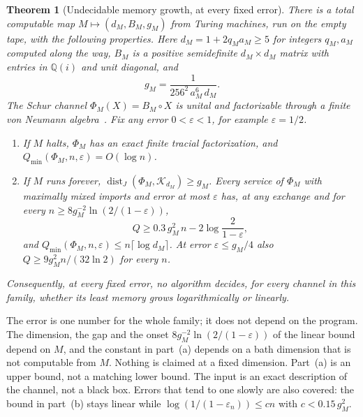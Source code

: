 \documentclass[11pt]{article}
\newtheorem{theorem}{Theorem}
\theoremstyle{definition}
\theoremstyle{remark}
\DeclareMathOperator{\dist}{dist}
\newcommand{\K}{\mathcal K}
\newcommand{\eps}{\varepsilon}
\begin{document}
\begin{theorem}[Undecidable memory growth, at every fixed error]\label{thm:undecidable}
There is a total computable map $M\mapsto(d_M,B_M,g_M)$ from Turing machines, run on the empty tape, with the following properties. Here $d_M=1+2q_Ma_M\ge5$ for integers $q_M,a_M$ computed along the way, $B_M$ is a positive semidefinite $d_M\times d_M$ matrix with entries in $\mathbb Q(i)$ and unit diagonal, and
\[
 g_M=\frac{1}{256^2\,a_M^6\,d_M}.
\]
The Schur channel $\Phi_M(X)=B_M\circ X$ is unital and factorizable through a finite von Neumann algebra~\cite[Proposition~2.8]{HM2011}. Fix any error $0<\eps<1$, for example $\eps=1/2$.
\begin{enumerate}[label=(\alph*),itemsep=3pt]
\item If $M$ halts, $\Phi_M$ has an exact finite tracial factorization, and $Q_{\min}(\Phi_M,n,\eps)=O(\log n)$.
\item If $M$ runs forever, $\dist_J(\Phi_M,\K_{d_M})\ge g_M$. Every service of $\Phi_M$ with maximally mixed imports and error at most $\eps$ has, at any exchange and for every $n\ge8g_M^{-2}\ln(2/(1-\eps))$,
\[
 Q\ge0.3\,g_M^2\,n-2\log\frac2{1-\eps},
\]
and $Q_{\min}(\Phi_M,n,\eps)\le n\lceil\log d_M\rceil$. At error $\eps\le g_M/4$ also $Q\ge9g_M^2n/(32\ln2)$ for every $n$.
\end{enumerate}
Consequently, at every fixed error, no algorithm decides, for every channel in this family, whether its least memory grows logarithmically or linearly.
\end{theorem}

The error is one number for the whole family; it does not depend on the program. The dimension, the gap and the onset $8g_M^{-2}\ln(2/(1-\eps))$ of the linear bound depend on $M$, and the constant in part~(a) depends on a bath dimension that is not computable from $M$. Nothing is claimed at a fixed dimension. Part~(a) is an upper bound, not a matching lower bound. The input is an exact description of the channel, not a black box. Errors that tend to one slowly are also covered: the bound in part~(b) stays linear while $\log(1/(1-\eps_n))\le cn$ with $c<0.15\,g_M^2$.
\end{document}
